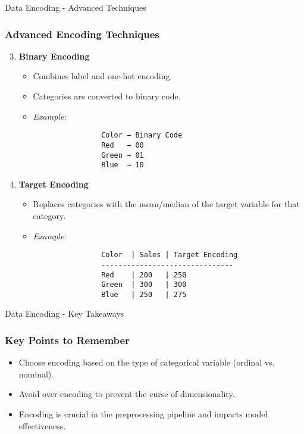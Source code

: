 \documentclass[aspectratio=169]{beamer}
\begin{document}
\begin{frame}[fragile]{Data Encoding - Advanced Techniques}
    \frametitle{Advanced Encoding Techniques}

    \begin{enumerate}
        \setcounter{enumi}{2}
        \item \textbf{Binary Encoding}
            \begin{itemize}
                \item Combines label and one-hot encoding.
                \item Categories are converted to binary code.
                \item \textit{Example:} 
                \begin{verbatim}
                Color → Binary Code
                Red   → 00
                Green → 01
                Blue  → 10
                \end{verbatim}
            \end{itemize}
        
        \item \textbf{Target Encoding}
            \begin{itemize}
                \item Replaces categories with the mean/median of the target variable for that category.
                \item \textit{Example:} 
                \begin{verbatim}
                Color  | Sales | Target Encoding
                -------------------------------
                Red    | 200   | 250
                Green  | 300   | 300
                Blue   | 250   | 275
                \end{verbatim}
            \end{itemize}
    \end{enumerate}
\end{frame}

\begin{frame}[fragile]{Data Encoding - Key Takeaways}
    \frametitle{Key Points to Remember}
    
    \begin{itemize}
        \item Choose encoding based on the type of categorical variable (ordinal vs. nominal).
        \item Avoid over-encoding to prevent the curse of dimensionality.
        \item Encoding is crucial in the preprocessing pipeline and impacts model effectiveness.
    \end{itemize}
\end{frame}
\end{document}
